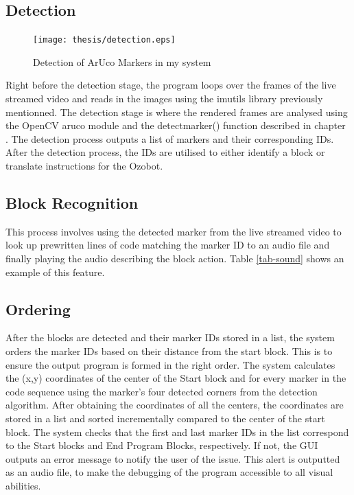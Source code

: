 \documentclass[oneside,%
                    author={Malak Hajji},
                    degree={BSc},
                    title={Designing An Accessible Computational Toolkit For Students},
                  subtitle={With Mixed Visual Abilities}]{dissertation}
\begin{document}
\subsection{Detection} 
\FloatBarrier
\begin{figure}[h]
    \centering
    \texttt{[image: thesis/detection.eps]}
    \caption{Detection of ArUco Markers in my system}
    \label{fig-detection}
\end{figure}
\FloatBarrier
Right before the detection stage, the program loops over the frames of the live streamed video and reads in the images using the imutils library previously mentionned. The detection stage is where the rendered frames are analysed using the OpenCV aruco module and the detectmarker() function described in chapter . 
The detection process outputs a list of markers and their corresponding IDs. 
After the detection process, the IDs are utilised to either identify a block or translate instructions for the Ozobot. 
 
\subsection{Block Recognition}
 
This process involves using the detected marker from the live streamed video to look up prewritten lines of code matching the marker ID to an audio file and finally playing the audio describing the block action. Table \ref{tab-sound} shows an example of this feature.

\subsection{Ordering} 
 
After the blocks are detected and their marker IDs stored in a list, the system orders the marker IDs based on their distance from the start block. This is to ensure the output program is formed in the right order. The system calculates the (x,y) coordinates of the center of the Start block and for every marker in the code sequence using the marker's four detected corners from the detection algorithm. After obtaining the coordinates of all the centers, the coordinates are stored in a list and sorted incrementally compared to the center of the start block. 
The system checks that the first and last marker IDs in the list correspond to the Start blocks and End Program Blocks, respectively. If not, the GUI outputs an error message to notify the user of the issue. This alert is outputted as an audio file, to make the debugging of the program accessible to all visual abilities.  
\end{document}
